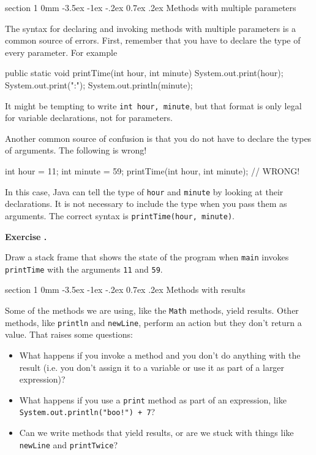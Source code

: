 \documentclass{book}
\makeatletter
\newcounter{exercisenum}
\renewcommand{\theexercisenum}{{\thechapter}.\arabic{exercisenum}}
\newenvironment{exercisesize}{\begin{small}}{\end{small}}
\newcommand{\exerciseheader}[2]{                                          
     
  \begin{exercisesize}                                                    
     
     
  \def\theenumi{\alph{enumi}}                                             
  \def\labelenumi{\theenumi.}                                             
  \def\theenumii{\roman{enumii}}                                          
  \def\labelenumii{\theenumii.}                                           
  {\bf Exercise {#1}{#2}}\hspace{0.1in}                 
}
\newcommand{\startexercise}[1]{%
  \refstepcounter{exercisenum}                                            
  \exerciseheader{\theexercisenum}{#1}                                    
}
\newcommand{\stopexercise}{%
  {\hfill}                                                               
  \end{exercisesize}      
}
\newcommand{\normaldif}{}
\newenvironment{exercise}{\startexercise{\normaldif{}}}{\stopexercise}
\renewcommand{\section}{\@startsection 
    {section} {1} {0mm}%
    {-3.5ex \@plus -1ex \@minus -.2ex}%
    {0.7ex \@plus.2ex}%
    {\normalfont\Large\bfseries}}
\makeatother
\begin{document}
\section {Methods with multiple parameters}
\label{time}

The syntax for declaring and invoking methods with multiple
parameters is a common source of errors.  First, remember
that you have to declare the type of every parameter.  For
example

\begin{verbatimtab}
  public static void printTime(int hour, int minute) {
    System.out.print(hour);
    System.out.print(":");
    System.out.println(minute);
  }
\end{verbatimtab}
%
It might be tempting to write {\tt int hour, minute}, but
that format is only legal for variable declarations, not
for parameters.

Another common source of confusion is that you do not have
to declare the types of arguments.  The following is wrong!

\begin{verbatimtab}
    int hour = 11;
    int minute = 59;
    printTime(int hour, int minute);   // WRONG!
\end{verbatimtab}
%
In this case, Java can tell the type of {\tt hour}
and {\tt minute} by looking at their declarations.  It is
not necessary to include the type when you pass them
as arguments.  The correct
syntax is {\tt printTime(hour, minute)}.

\begin{exercise}
Draw a stack frame that shows the state of the program
when {\tt main} invokes {\tt printTime}
with the arguments {\tt 11} and {\tt 59}.
\end{exercise}


\section {Methods with results}

Some of the methods we are using,
like the {\tt Math} methods, yield results.  Other methods,
like {\tt println} and {\tt newLine}, perform an action but
they don't return a value.  That raises some questions:

\begin{itemize}

\item What happens if you invoke a method and you don't
do anything with the result (i.e. you don't assign it to
a variable or use it as part of a larger expression)?

\item What happens if you use a {\tt print} method as part
of an expression, like {\tt System.out.println("boo!") + 7}?

\item Can we write methods that yield results, or are we
stuck with things like {\tt newLine} and {\tt printTwice}?

\end{itemize}
\end{document}
